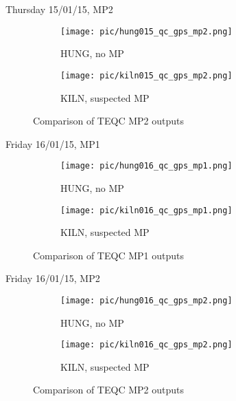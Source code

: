\documentclass[11pt]{beamer}
\begin{document}
{\begin{frame}{Thursday 15/01/15, MP2}
	\begin{figure}
		\centering
		\begin{subfigure}{.5\textwidth}
			\centering
			\texttt{[image: pic/hung015\_qc\_gps\_mp2.png]}
			\caption{HUNG, no MP}
			\label{fig:sub1}
		\end{subfigure}%
		\begin{subfigure}{.5\textwidth}
			\centering
			\texttt{[image: pic/kiln015\_qc\_gps\_mp2.png]}
			\caption{KILN, suspected MP}
			\label{fig:sub2}
		\end{subfigure}
		\caption{Comparison of TEQC MP2 outputs}
	\end{figure}
\end{frame}

\begin{frame}{Friday 16/01/15, MP1}
	\begin{figure}
		\centering
		\begin{subfigure}{.5\textwidth}
			\centering
			\texttt{[image: pic/hung016\_qc\_gps\_mp1.png]}
			\caption{HUNG, no MP}
			\label{fig:sub1}
		\end{subfigure}%
		\begin{subfigure}{.5\textwidth}
			\centering
			\texttt{[image: pic/kiln016\_qc\_gps\_mp1.png]}
			\caption{KILN, suspected MP}
			\label{fig:sub2}
		\end{subfigure}
		\caption{Comparison of TEQC MP1 outputs}
	\end{figure}
\end{frame}

\begin{frame}{Friday 16/01/15, MP2}
	\begin{figure}
		\centering
		\begin{subfigure}{.5\textwidth}
			\centering
			\texttt{[image: pic/hung016\_qc\_gps\_mp2.png]}
			\caption{HUNG, no MP}
			\label{fig:sub1}
		\end{subfigure}%
		\begin{subfigure}{.5\textwidth}
			\centering
			\texttt{[image: pic/kiln016\_qc\_gps\_mp2.png]}
			\caption{KILN, suspected MP}
			\label{fig:sub2}
		\end{subfigure}
		\caption{Comparison of TEQC MP2 outputs}
	\end{figure}
\end{frame}

}
\end{document}
